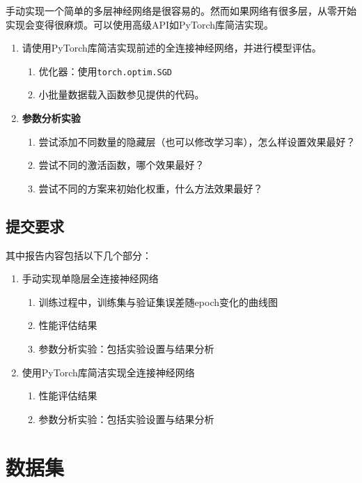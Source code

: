 \documentclass[12pt]{article}
\begin{document}
手动实现一个简单的多层神经网络是很容易的。然而如果网络有很多层，从零开始实现会变得很麻烦。可以使用高级API如PyTorch库简洁实现。


\begin{enumerate}
    \item 请使用PyTorch库简洁实现前述的全连接神经网络，并进行模型评估。
   \begin{enumerate}
    \item 优化器：使用\texttt{torch.optim.SGD}
    \item 小批量数据载入函数参见提供的代码。
   \end{enumerate}
    \item \textbf{参数分析实验}
    \begin{enumerate}
        \item 尝试添加不同数量的隐藏层（也可以修改学习率），怎么样设置效果最好？
        \item 尝试不同的激活函数，哪个效果最好？
        \item 尝试不同的方案来初始化权重，什么方法效果最好？
    \end{enumerate}
\end{enumerate}

\subsection{\textbf{提交要求}}
其中报告内容包括以下几个部分：
\begin{enumerate}
    \item 手动实现单隐层全连接神经网络
    \begin{enumerate}
        \item 训练过程中，训练集与验证集误差随epoch变化的曲线图
        \item 性能评估结果
        \item 参数分析实验：包括实验设置与结果分析
    \end{enumerate}
    \item 使用PyTorch库简洁实现全连接神经网络
    \begin{enumerate}
        \item 性能评估结果
        \item 参数分析实验：包括实验设置与结果分析
    \end{enumerate}
\end{enumerate}

\section{数据集}
\end{document}
